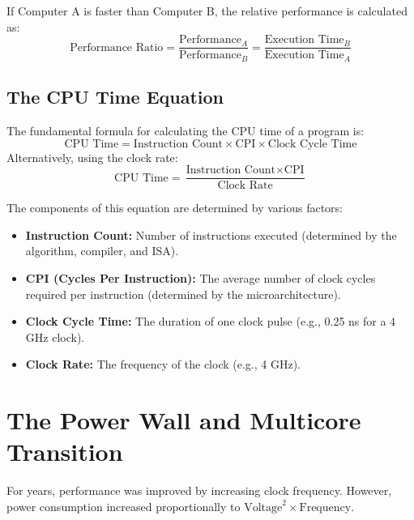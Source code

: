 \begin{proposition}
If Computer A is faster than Computer B, the relative performance is calculated as:
\begin{equation}
\text{Performance Ratio} = \frac{\text{Performance}_A}{\text{Performance}_B} = \frac{\text{Execution Time}_B}{\text{Execution Time}_A}
\end{equation}
\end{proposition}

\subsection{The CPU Time Equation}

\begin{theorem}
The fundamental formula for calculating the CPU time of a program is:
\begin{equation}
\text{CPU Time} = \text{Instruction Count} \times \text{CPI} \times \text{Clock Cycle Time}
\end{equation}
Alternatively, using the clock rate:
\begin{equation}
\text{CPU Time} = \frac{\text{Instruction Count} \times \text{CPI}}{\text{Clock Rate}}
\end{equation}
\end{theorem}

\noindent The components of this equation are determined by various factors:

\begin{itemize}
    \item \textbf{Instruction Count:} Number of instructions executed (determined by the algorithm, compiler, and ISA).
    \item \textbf{CPI (Cycles Per Instruction):} The average number of clock cycles required per instruction (determined by the microarchitecture).
    \item \textbf{Clock Cycle Time:} The duration of one clock pulse (e.g., 0.25 ns for a 4 GHz clock).
    \item \textbf{Clock Rate:} The frequency of the clock (e.g., 4 GHz).
\end{itemize}

\section{The Power Wall and Multicore Transition}

For years, performance was improved by increasing clock frequency. However, power consumption increased proportionally to $\text{Voltage}^2 \times \text{Frequency}$.

